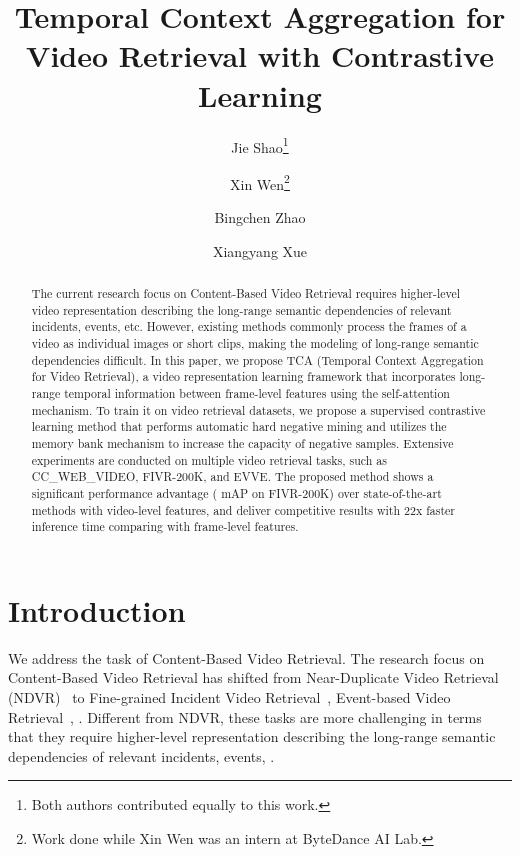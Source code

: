 \documentclass[10pt,twocolumn,letterpaper]{article}
\newcommand\CoAuthorMark{\footnotemark[\arabic{footnote}]}
\begin{document}
\title{Temporal Context Aggregation for Video Retrieval with Contrastive Learning}

\author[1,3]{Jie Shao\thanks{Both authors contributed equally to this work.}}
\author[2,3]{Xin Wen\protect\CoAuthorMark\thanks{Work done while Xin Wen was an intern at ByteDance AI Lab.}}
\author[2]{Bingchen Zhao}
\author[1]{Xiangyang Xue}

\maketitle


\begin{abstract}
The current research focus on Content-Based Video Retrieval requires higher-level video representation describing the long-range semantic dependencies of relevant incidents, events, etc. However, existing methods commonly process the frames of a video as individual images or short clips, making the modeling of long-range semantic dependencies difficult. In this paper, we propose TCA (Temporal Context Aggregation for Video Retrieval), a video representation learning framework that incorporates long-range temporal information between frame-level features using the self-attention mechanism. To train it on video retrieval datasets, we propose a supervised contrastive learning method that performs automatic hard negative mining and utilizes the memory bank mechanism to increase the capacity of negative samples. Extensive experiments are conducted on multiple video retrieval tasks, such as CC\_WEB\_VIDEO, FIVR-200K, and EVVE. The proposed method shows a significant performance advantage ( mAP on FIVR-200K) over state-of-the-art methods with video-level features, and deliver competitive results with 22x faster inference time comparing with frame-level features.
\end{abstract}


\section{Introduction}
We address the task of Content-Based Video Retrieval. The research focus on Content-Based Video Retrieval has shifted from Near-Duplicate Video Retrieval (NDVR)~\cite{wu2007practical,jiang2014vcdb} to Fine-grained Incident Video Retrieval~\cite{kordopatis2019fivr}, Event-based Video Retrieval~\cite{revaud2013event}, \etc. Different from NDVR, these tasks are more challenging in terms that they require higher-level representation describing the long-range semantic dependencies of relevant incidents, events, \etc.
\end{document}
